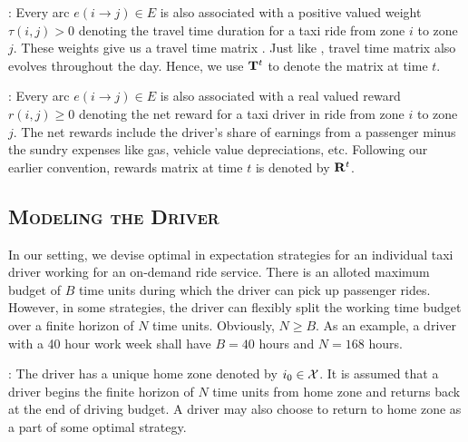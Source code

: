 :
Every arc $e(i\rightarrow j) \in E$ is also associated with a positive valued weight $\tau(i,j) > 0$ 
denoting the travel time duration for a taxi ride from zone $i$ to zone $j$. 
These weights give us a travel time matrix {\traveltimematrix}. 
Just like {\empiricaltransitionmatrix},  travel time matrix also evolves throughout the day. 
Hence, we use ${\mathbf{T}}^t$ to denote the matrix at time $t$.


:
Every arc $e(i \rightarrow j) \in E$ is also associated with a real valued reward $r(i,j) \geq 0$ denoting
the net reward for a taxi driver in ride from zone $i$ to zone $j$. The net rewards include the driver's
share of earnings from a passenger minus the sundry expenses like gas, vehicle value depreciations, etc.
Following our earlier convention, rewards matrix at time $t$ is denoted by ${\mathbf{R}}^t$.

\subsection{\textsc{Modeling the Driver}}

In our setting, we devise optimal in expectation strategies for an individual taxi driver working for an
on-demand ride service. There is an alloted maximum budget of $B$ time units during which the driver can pick
up passenger rides. However, in some strategies, the driver can flexibly split the working time budget 
over a finite horizon of $N$ time units. Obviously, $N \geq B$. As an example, a driver with a 40 hour work week
shall have $B=40$ hours and $N=168$ hours.


: 
The driver has a unique home zone denoted by $i_0 \in \mathcal{X}$. It is assumed that a driver begins the finite horizon of $N$
time units from home zone and returns back at the end of driving budget. A driver may also choose to return to 
home zone as a part of some optimal strategy.

